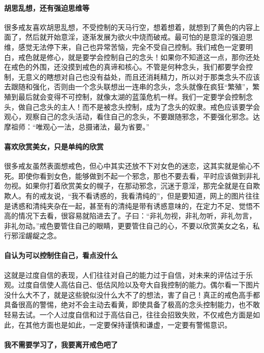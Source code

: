 \paragraph{胡思乱想，还有强迫思维等}

很多戒友喜欢胡思乱想，不受控制的天马行空，想着想着，就想到了黄色的内容上面了，然后就开始意淫，逐渐发展为欲火中烧而破戒。最可怕的是意淫的强迫思维，感觉无法停下来，自己也异常苦恼，完全不受自己控制。我们戒色一定要明白，戒色就是修心，就是要学会控制自己的念头！如果你不知道这一点，那你还处在戒色的外围，还没摸到戒色的真谛和核心。不管是何种念头，我们都要学会控制，无意义的瞎想对自己也没有益处，而且还消耗精力，所以对于那类念头不应该去跟随和强化，否则由一个念头联想出一连串的念头，念头就像在疯狂“繁殖”，繁殖到最后就会变得不可控制，就像太湖的蓝藻危机一样。我们一定要学会控制念头，做自己念头的主人！而不是被念头控制，成为了念头的奴隶。戒色应该要学会观心，观察自己的念头活动，看住自己的念头，不要跟随邪念，不要强化邪念。达摩祖师：“唯观心一法，总摄诸法，最为省要。”

\paragraph{喜欢欣赏美女，只是单纯的欣赏}

很多戒友虽然表面想戒色，但心中其实还放不下对女色的迷恋，这其实就是偷心不死。即使你看到女色，能够做到不起一个邪念，那也不要去看，平时应该做到非礼勿视。如果你打着欣赏美女的幌子，在那动邪念，沉迷于意淫，那完全就是在自欺欺人。有的戒友说，“我不看诱惑的，我看清纯的”，但是要知道，网上的图片往往是诱惑和清纯夹杂在一起，甚至有的清纯是带有诱惑意味的，在定力不足、觉悟不高的情况下去看，很容易就陷进去了。子曰：“非礼勿视，非礼勿听，非礼勿言，非礼勿动。”戒色要管住自己的眼睛，更要管住自己的心，不要以欣赏美女之名，私行邪淫龌龊之念。

\paragraph{自认为可以控制住自己，看点没什么}

这就是过度自信的表现，人们往往对自己的能力过于自信，对未来的评估过于乐观。过度自信使人高估自己、低估风险以及夸大自我控制的能力。偶尔看一下图片没什么大不了，就是这些貌似没什么大不了的想法，害了自己！真正的戒色高手都具备很高的警惕，绝对不会主动去看黄，即使具备了极高的念头控制能力，也不敢轻易去试。一个人过度自信和过于高估自己，往往会招致失败，不仅戒色方面是如此，在其他方面也是如此，一定要保持谨慎和谦虚，一定要有警惕意识。

\paragraph{我不需要学习了，我要离开戒色吧了}

